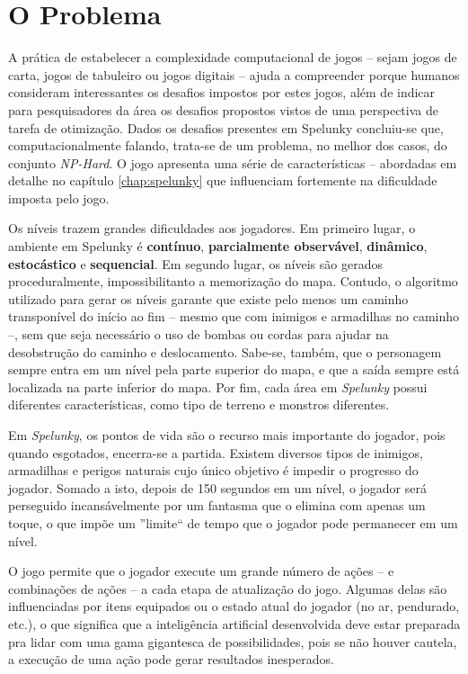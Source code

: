 \section{\label{section:problem}O Problema}
A prática de estabelecer a complexidade computacional de jogos -- sejam jogos de
carta, jogos de tabuleiro ou jogos digitais -- ajuda a compreender  porque
humanos consideram interessantes os desafios impostos por estes jogos, além de
indicar para pesquisadores da área os desafios propostos vistos de uma
perspectiva de tarefa de otimização.  Dados os desafios presentes em Spelunky
concluiu-se que, computacionalmente falando, trata-se de um problema, no melhor
dos casos, do conjunto \textit{NP-Hard}\cite{SPELUNKYHARD}. O jogo apresenta uma
série de características -- abordadas em detalhe no capítulo \ref{chap:spelunky}
que influenciam fortemente na dificuldade imposta pelo jogo.

Os níveis trazem grandes dificuldades aos jogadores. Em primeiro lugar, o
ambiente em Spelunky é \textbf{contínuo}, \textbf{parcialmente observável},
\textbf{dinâmico}, \textbf{estocástico} e \textbf{sequencial}. Em segundo
lugar, os níveis são gerados proceduralmente, impossibilitanto a memorização do
mapa.  Contudo, o algoritmo utilizado para gerar os níveis garante que existe
pelo menos um caminho transponível do início ao fim -- mesmo que com inimigos e
armadilhas no caminho --, sem que seja necessário o uso de bombas ou cordas
para ajudar na desobstrução do caminho e deslocamento. Sabe-se, também, que o
personagem sempre entra em um nível pela parte superior do mapa, e que a saída
sempre está localizada na parte inferior do mapa. Por fim, cada área em
\textit{Spelunky} possui diferentes características, como tipo de terreno e
monstros diferentes.

Em \textit{Spelunky}, os pontos de vida são o recurso mais importante do
jogador, pois quando esgotados, encerra-se a partida. Existem diversos tipos de
inimigos, armadilhas e perigos naturais cujo único objetivo é impedir o
progresso do jogador.  Somado a isto, depois de 150 segundos em um nível, o
jogador será perseguido incansávelmente por um fantasma que o elimina com apenas
um toque, o que impõe um ''limite`` de tempo que o jogador pode permanecer em um
nível.

O jogo permite que o jogador execute um grande número de ações -- e combinações
de ações -- a cada etapa de atualização do jogo. Algumas delas são influenciadas
por itens equipados ou o estado atual do jogador (no ar, pendurado, etc.), o que
significa que a inteligência artificial desenvolvida deve estar preparada pra
lidar com uma gama gigantesca de possibilidades, pois se não houver cautela, a
execução de uma ação pode gerar resultados inesperados.


